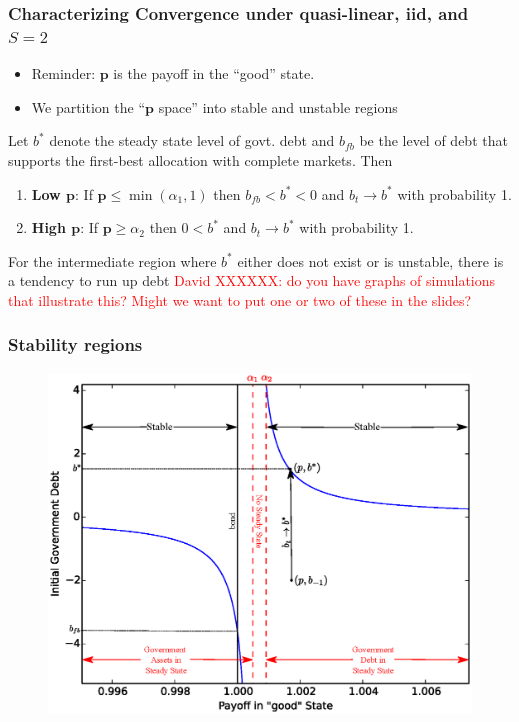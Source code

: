 \documentclass{beamer}
\begin{document}
  \begin{frame}
  \frametitle{Characterizing Convergence under quasi-linear, iid, and $S=2$}

  \begin{itemize}
  \item Reminder:  $\bm{p}$ is the payoff in the ``good'' state.
   \item We partition  the ``$\bm{p}$ space'' into stable and unstable regions
     \end{itemize}

 	\begin{theorem}
Let $b^*$ denote the steady state level of govt.  debt and $b_{fb}$ be the level of debt that  supports the first-best allocation with complete markets.  Then %
		\begin{enumerate}
			\item  \textbf{Low $\bm{p}$}: If $\bm{p}\leq\min(\alpha_1,1)$ then  $b_{fb}<b^*<0$ and $b_t\rightarrow b^*$ with probability 1.
			\item \textbf{High  $\bm{p}$}:  If $\bm{p} \geq \alpha_2$ then   $0<b^*$ and $b_t \rightarrow b^*$ with probability 1.
			
			
			\end{enumerate}
			\end{theorem}
			
			For the intermediate region where  $b^*$ either does not exist or is unstable, there is a tendency to run up debt
\textcolor{red}{David XXXXXX: do you have graphs of simulations that illustrate this? Might we want to put one or two of these in the slides?}
		
		
	
 \end{frame}


\begin{frame}
   \frametitle{Stability regions}
	\begin{figure}
		\begin{center}
		\includegraphics[scale=.5]{Images/graph_stable.eps}
	\end{center}	
	\end{figure}

  \end{frame}
\end{document}
